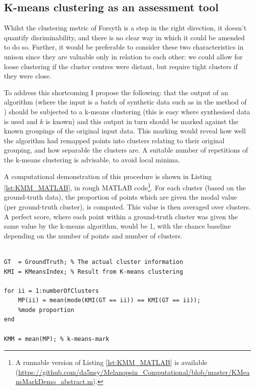 \subsection{K-means clustering as an assessment tool}

Whilst the clustering metric of Forsyth is a step in the right direction, it doesn't quantify disriminability, and there is no clear way in which it could be amended to do so. Further, it would be preferable to consider these two characteristics in unison since they are valuable only in relation to each other: we could allow for loose clustering if the cluster centres were distant, but require tight clusters if they were close. 

To address this shortcoming I propose the following: that the output of an algorithm (where the input is a batch of synthetic data such as in the method of \citet{barnard_comparison_2002}) should be subjected to a k-means clustering (this is easy where synthesised data is used and $k$ is known) and this output in turn should be marked against the known groupings of the original input data. This marking would reveal how well the algorithm had remapped points into clusters relating to their original grouping, and how separable the clusters are. A suitable number of repetitions of the k-means clustering is advisable, to avoid local minima. 

A computational demonstration of this procedure is shown in Listing \ref{lst:KMM_MATLAB}, in rough \gls{MATLAB} code\footnote{A runnable version of Listing \ref{lst:KMM_MATLAB} is available (\url{https://github.com/da5nsy/Melanopsin_Computational/blob/master/KMeansMarkDemo_abstract.m}).}. For each cluster (based on the ground-truth data), the proportion of points which are given the modal value (per ground-truth cluster), is computed. This value is then averaged over clusters. A perfect score, where each point within a ground-truth cluster was given the same value by the k-means algorithm, would be 1, with the chance baseline depending on the number of points and number of clusters. 

\begin{lstlisting}[style = Matlab-editor, basicstyle = \mlttfamily, float = htbp, caption = Abstracted MATLAB code showing the k-means-mark computation, label = lst:KMM_MATLAB ]

GT  = GroundTruth; % The actual cluster information
KMI = KMeansIndex; % Result from K-means clustering

for ii = 1:numberOfClusters
    MP(ii) = mean(mode(KMI(GT == ii)) == KMI(GT == ii)); 
    %mode proportion
end

KMM = mean(MP); % k-means-mark

\end{lstlisting}



